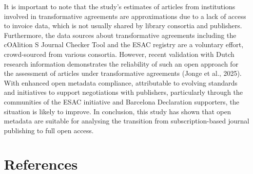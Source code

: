 \documentclass[a4paper,man,floatsintext,longtable,noextraspace,10pt]{apa6}
\begin{document}
It is important to note that the study's estimates of articles from
institutions involved in transformative agreements are approximations
due to a lack of access to invoice data, which is not usually shared by
library consortia and publishers. Furthermore, the data sources about
transformative agreements including the cOAlition S Journal Checker Tool
and the ESAC registry are a voluntary effort, crowd-sourced from various
consortia. However, recent validation with Dutch research information
demonstrates the reliability of such an open approach for the assessment
of articles under transformative agreements (Jonge et al., 2025). With
enhanced open metadata compliance, attributable to evolving standards
and initiatives to support negotiations with publishers, particularly
through the communities of the ESAC initiative and Barcelona Declaration
supporters, the situation is likely to improve. In conclusion, this
study has shown that open metadata are suitable for analysing the
transition from subscription-based journal publishing to full open
access.

\section{References}\label{references}
\end{document}
